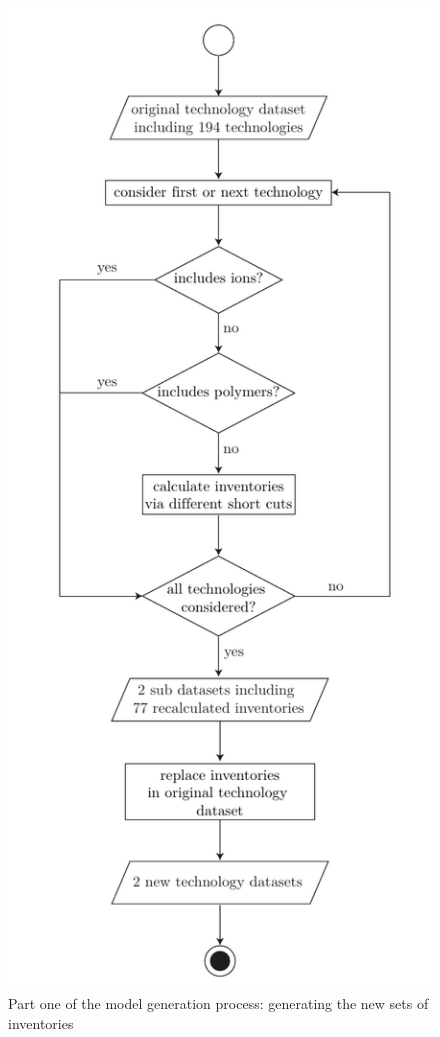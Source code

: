\begin{figure}[htp]
        \centering
        \includegraphics{images/plan_1.pdf}
        \caption{Part one of the model generation process: generating the new sets of inventories}
        \label{fig:plan_1}
\end{figure}

